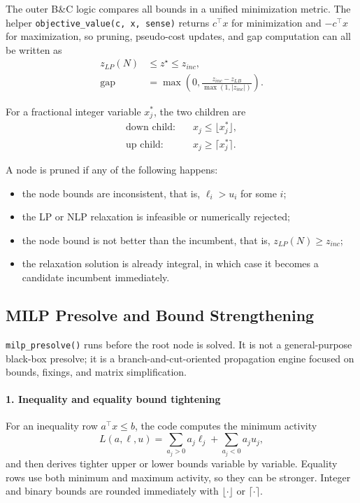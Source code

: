 The outer B\&C logic compares all bounds in a unified minimization metric. The helper
\texttt{objective\_value(c, x, sense)} returns \(c^\top x\) for minimization and
\(-c^\top x\) for maximization, so pruning, pseudo-cost updates, and gap computation can all be written as
\begin{align}
  z_{LP}(N) &\le z^\star \le z_{inc}, \\
  \text{gap} &= \max\!\left(0, \frac{z_{inc} - z_{LB}}{\max(1, |z_{inc}|)}\right).
\end{align}

For a fractional integer variable \(x_j^\ast\), the two children are
\begin{align}
  \text{down child}:\quad & x_j \le \lfloor x_j^\ast \rfloor, \\
  \text{up child}:\quad   & x_j \ge \lceil x_j^\ast \rceil.
\end{align}

A node is pruned if any of the following happens:
\begin{itemize}
  \item the node bounds are inconsistent, that is, \(\ell_i > u_i\) for some \(i\);
  \item the LP or NLP relaxation is infeasible or numerically rejected;
  \item the node bound is not better than the incumbent, that is, \(z_{LP}(N) \ge z_{inc}\);
  \item the relaxation solution is already integral, in which case it becomes a candidate incumbent immediately.
\end{itemize}

\subsection{MILP Presolve and Bound Strengthening}

\texttt{milp\_presolve()} runs before the root node is solved. It is not a general-purpose black-box presolve; it is a branch-and-cut-oriented propagation engine focused on bounds, fixings, and matrix simplification.

\paragraph{1. Inequality and equality bound tightening}
For an inequality row \(a^\top x \le b\), the code computes the minimum activity
\begin{equation}
L(a,\ell,u)=\sum_{a_j>0} a_j \ell_j + \sum_{a_j<0} a_j u_j,
\end{equation}
and then derives tighter upper or lower bounds variable by variable. Equality rows use both minimum and maximum activity, so they can be stronger. Integer and binary bounds are rounded immediately with \(\lfloor \cdot \rfloor\) or \(\lceil \cdot \rceil\).

